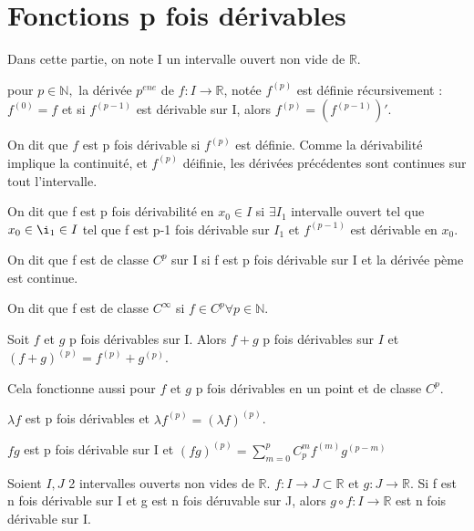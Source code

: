 \documentclass[french]{yLectureNote}
\newcommand{\N}[0]{\mathbb{N}}
\newcommand{\R}[0]{\mathbb{R}}
\begin{document}
\section{Fonctions p fois dérivables}
Dans cette partie, on note I un intervalle ouvert non vide de $\R$.
\begin{definition}
pour $p\in \N,$ la dérivée $p^{ene}$ de $f:I\to \R$, notée $f^{(p)}$ est définie récursivement : $f^{(0)} = f$ et si $f^{(p-1)}$ est dérivable sur I, alors $f^{(p)}  = (f^{(p-1)})'$.
\end{definition}
On dit que $f$ est p fois dérivable si $f^{(p)}$ est définie. Comme la dérivabilité implique la continuité, et $f^{(p)}$ déifinie, les dérivées précédentes sont continues sur tout l'intervalle.
\begin{definition}
On dit que f est p fois dérivabilité en \(x_0 \in I\) si \(\exists I_1\) intervalle ouvert tel que \(x_0\in\i_1\in I\) tel que f est p-1 fois dérivable sur \(I_1\) et \(f^{(p-1)}\) est dérivable en \(x_0\).
\end{definition}
\begin{definition}[Classe ]
On dit que f est de classe \(C^p\) sur I si f est p fois dérivable sur I et la dérivée pème est continue.

On dit que f est de classe \(C^{\infty}\) si \(f\in C^p \forall p\in\N\).
\end{definition}
\begin{proposition}
Soit \(f\) et \(g\) p fois dérivables sur I. Alors $f+g$ p fois dérivables sur $I$ et $(f+g)^{(p)} = f^{(p)} + g^{(p)}$.
\end{proposition}
Cela fonctionne aussi pour $f$ et $g$ p fois dérivables en un point et de classe $C^p$.

\begin{proposition}
\(\lambda f\) est p fois dérivables et \(\lambda f^{(p)} = (\lambda f)^{(p)}\).
\end{proposition}
\begin{proposition}
\(fg\) est p fois dérivable sur I et \((fg)^{(p)} = \sum^p_{m=0} C^m_p f^{(m)}g^{(p-m)}\)
\end{proposition}
\begin{proposition}
Soient \(I,J\) 2 intervalles ouverts non vides de \(\mathbb{R}\). \(f:I\to J\subset \mathbb{R}\) et \(g : J\to \mathbb{R}\). Si f est n fois dérivable sur I et g est n fois déruvable sur J, alors \(g\circ f : I\to \mathbb{R}\) est n fois dérivable sur I.
\end{proposition}
\end{document}
